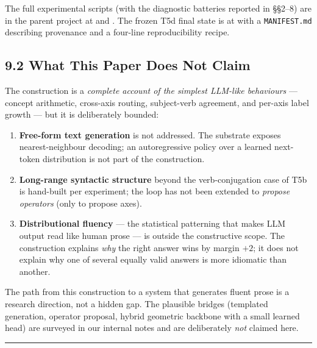 \documentclass[
  twocolumn,
  10pt,
  a4paper]{article}
\providecommand{\tightlist}{%
  \setlength{\itemsep}{0pt}\setlength{\parskip}{0pt}}
\begin{document}
The full experimental scripts (with the diagnostic batteries reported in
§§2--8) are in the parent project at \texttt{} and
\texttt{}. The frozen T5d final state is at
\texttt{} with a \texttt{MANIFEST.md}
describing provenance and a four-line reproducibility recipe.

\hypertarget{what-this-paper-does-not-claim}{%
\subsection{9.2 What This Paper Does Not
Claim}\label{what-this-paper-does-not-claim}}

The construction is a \emph{complete account of the simplest LLM-like
behaviours} --- concept arithmetic, cross-axis routing, subject-verb
agreement, and per-axis label growth --- but it is deliberately bounded:

\begin{enumerate}
\def\labelenumi{\arabic{enumi}.}
\tightlist
\item
  \textbf{Free-form text generation} is not addressed. The substrate
  exposes nearest-neighbour decoding; an autoregressive policy over a
  learned next-token distribution is not part of the construction.
\item
  \textbf{Long-range syntactic structure} beyond the verb-conjugation
  case of T5b is hand-built per experiment; the loop has not been
  extended to \emph{propose operators} (only to propose axes).
\item
  \textbf{Distributional fluency} --- the statistical patterning that
  makes LLM output read like human prose --- is outside the constructive
  scope. The construction explains \emph{why} the right answer wins by
  margin \(+2\); it does not explain why one of several equally valid
  answers is more idiomatic than another.
\end{enumerate}

The path from this construction to a system that generates fluent prose
is a research direction, not a hidden gap. The plausible bridges
(templated generation, operator proposal, hybrid geometric backbone with
a small learned head) are surveyed in our internal notes and are
deliberately \emph{not} claimed here.

\begin{center}\rule{0.5\linewidth}{0.5pt}\end{center}
\end{document}
